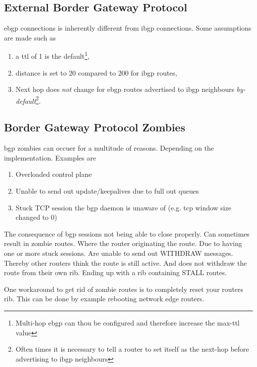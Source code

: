\subsection[eBGP]{External Border Gateway Protocol}

\gls{ebgp} connections is inherently different from \gls{ibgp} connections. Some assumptions are made such as
\begin{enumerate}
    \item a \gls{ttl} of 1 is the default\footnote{Multi-hop \gls{ebgp} can thou be configured and therefore increase the max-\gls{ttl} value},
    \item distance is set to 20 compared to 200 for \gls{ibgp} routes,
    \item Next hop does \textit{not} change for \gls{ebgp} routes advertised to \gls{ibgp} neighbours \textit{by-default}\footnote{Often times it is necessary to tell a router to set itself as the next-hop before advertising to \gls{ibgp} neighbours}.
\end{enumerate}

\subsection[bgpzombies]{Border Gateway Protocol Zombies}

\gls{bgp} zombies\cite{ietf-idr-bgp-sendholdtimer-00} can occuer for a multitude of reasons. Depending on the implementation. Examples are

\begin{enumerate}
    \item Overloaded control plane
    \item Unable to send out update/keepalives due to full out queues
    \item Stuck TCP session the \gls{bgp} daemon is unaware of (e.g. tcp window size changed to 0)
\end{enumerate}

The consequence of \gls{bgp} sessions not being able to close properly. Can sometimes result in zombie routes. Where the router originating the route. Due to having one or more stuck sessions. Are unable to send out WITHDRAW messages. Thereby other routers think the route is still active. And does not withdraw the route from their own \gls{rib}. Ending up with a \gls{rib} containing STALL routes.

One workaround to get rid of zombie routes is to completely reset your routers \gls{rib}. This can be done by example rebooting network edge routers\cite{Navigati54:online}.

